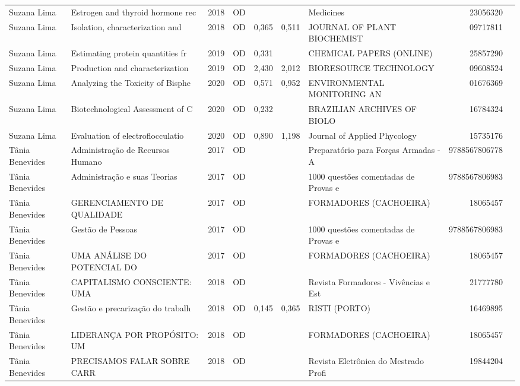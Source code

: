 \documentclass[12pt,brazil]{article}\usepackage[]{graphicx}\usepackage[]{xcolor}
\begin{document}
\begin{longtable}{lllrrllrr}
Suzana Lima & Estrogen and thyroid hormone rec & 2018 & OD &  &  & Medicines & 23056320 \\
Suzana Lima & Isolation, characterization and  & 2018 & OD & 0,365 & 0,511 & JOURNAL OF PLANT BIOCHEMIST & 09717811 \\
Suzana Lima & Estimating protein quantities fr & 2019 & OD & 0,331 &  & CHEMICAL PAPERS (ONLINE) & 25857290 \\
Suzana Lima & Production and characterization  & 2019 & OD & 2,430 & 2,012 & BIORESOURCE TECHNOLOGY & 09608524 \\
Suzana Lima & Analyzing the Toxicity of Bisphe & 2020 & OD & 0,571 & 0,952 & ENVIRONMENTAL MONITORING AN & 01676369 \\
Suzana Lima & Biotechnological Assessment of C & 2020 & OD & 0,232 &  & BRAZILIAN ARCHIVES OF BIOLO & 16784324 \\
\rowcolor{duplic}\rowcolor{duplic}\rowcolor{duplic}\rowcolor{duplic}\rowcolor{duplic}\rowcolor{duplic}\rowcolor{duplic}\rowcolor{duplic}\rowcolor{duplic}\rowcolor{duplic}\rowcolor{duplic}\rowcolor{duplic}\rowcolor{duplic}\rowcolor{duplic}\rowcolor{duplic}\rowcolor{duplic}Suzana Lima & Evaluation of electroflocculatio & 2020 & OD & 0,890 & 1,198 & Journal of Applied Phycology & 15735176 \\
Tânia Benevides & Administração de Recursos Humano & 2017 & OD &  &  & Preparatório para Forças Armadas - A & 9788567806778 \\
Tânia Benevides & Administração e suas Teorias & 2017 & OD &  &  & 1000 questões comentadas de Provas e & 9788567806983 \\
Tânia Benevides & GERENCIAMENTO DE QUALIDADE  & 2017 & OD &  &  & FORMADORES (CACHOEIRA) & 18065457 \\
Tânia Benevides & Gestão de Pessoas & 2017 & OD &  &  & 1000 questões comentadas de Provas e & 9788567806983 \\
Tânia Benevides & UMA ANÁLISE DO POTENCIAL DO & 2017 & OD &  &  & FORMADORES (CACHOEIRA) & 18065457 \\
Tânia Benevides & CAPITALISMO CONSCIENTE: UMA & 2018 & OD &  &  & Revista Formadores - Vivências e Est & 21777780 \\
Tânia Benevides & Gestão e precarização do trabalh & 2018 & OD & 0,145 & 0,365 & RISTI (PORTO) & 16469895 \\
Tânia Benevides & LIDERANÇA POR PROPÓSITO: UM & 2018 & OD &  &  & FORMADORES (CACHOEIRA) & 18065457 \\
Tânia Benevides & PRECISAMOS FALAR SOBRE CARR & 2018 & OD &  &  & Revista Eletrônica do Mestrado Profi & 19844204 \\

\end{longtable}
\end{document}
